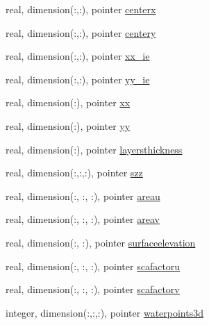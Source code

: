 \begin{DoxyCompactItemize}
\item 
real, dimension(\+:,\+:), pointer \mbox{\hyperlink{structmodulemercatorformat_1_1t__mercatorformat_ad68a31a65473f6983641c29cefea35ec}{centerx}}
\item 
real, dimension(\+:,\+:), pointer \mbox{\hyperlink{structmodulemercatorformat_1_1t__mercatorformat_a621f21d5c460bfd3b131359993260fc6}{centery}}
\item 
real, dimension(\+:,\+:), pointer \mbox{\hyperlink{structmodulemercatorformat_1_1t__mercatorformat_a8550469b3d43bd3aab27a9a2906a41c7}{xx\+\_\+ie}}
\item 
real, dimension(\+:,\+:), pointer \mbox{\hyperlink{structmodulemercatorformat_1_1t__mercatorformat_a3161855d8cd53a7567b85db4cc9fc512}{yy\+\_\+ie}}
\item 
real, dimension(\+:), pointer \mbox{\hyperlink{structmodulemercatorformat_1_1t__mercatorformat_a8b5bddfc588f6ca70681008ea42da11b}{xx}}
\item 
real, dimension(\+:), pointer \mbox{\hyperlink{structmodulemercatorformat_1_1t__mercatorformat_a88a4ef199a6380e17e0be95df57f3a4d}{yy}}
\item 
real, dimension(\+:), pointer \mbox{\hyperlink{structmodulemercatorformat_1_1t__mercatorformat_af793504be59d004deb0305ddf7c12817}{layersthickness}}
\item 
real, dimension(\+:,\+:,\+:), pointer \mbox{\hyperlink{structmodulemercatorformat_1_1t__mercatorformat_ac483ecc5b6a4d148a3bd9e1a076a63c4}{szz}}
\item 
real, dimension(\+:, \+:, \+:), pointer \mbox{\hyperlink{structmodulemercatorformat_1_1t__mercatorformat_a3dcf3e80c9ec90ef9a6372d03d91d272}{areau}}
\item 
real, dimension(\+:, \+:, \+:), pointer \mbox{\hyperlink{structmodulemercatorformat_1_1t__mercatorformat_aa50ad46074476cd24e306d7a06d95b42}{areav}}
\item 
real, dimension(\+:, \+:), pointer \mbox{\hyperlink{structmodulemercatorformat_1_1t__mercatorformat_a4a35fe27052f09032e8b1ea01e11ad8e}{surfaceelevation}}
\item 
real, dimension(\+:, \+:, \+:), pointer \mbox{\hyperlink{structmodulemercatorformat_1_1t__mercatorformat_a70dbf590ff9805ae16a79982f520370f}{scafactoru}}
\item 
real, dimension(\+:, \+:, \+:), pointer \mbox{\hyperlink{structmodulemercatorformat_1_1t__mercatorformat_aa3b9a9bde2ef7d61e5153cbb4cabe3eb}{scafactorv}}
\item 
integer, dimension(\+:,\+:,\+:), pointer \mbox{\hyperlink{structmodulemercatorformat_1_1t__mercatorformat_afdf3a0a4761ea5fd82a06266e80d6d91}{waterpoints3d}}

\end{DoxyCompactItemize}
